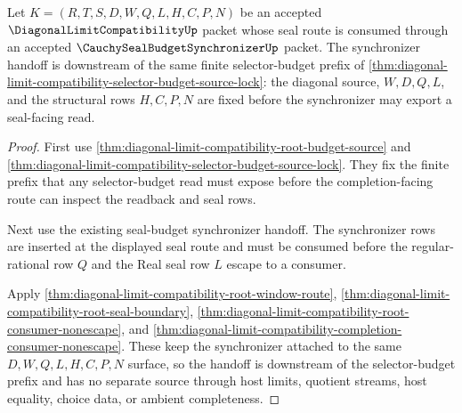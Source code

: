 \begin{theorem}
\label{thm:diagonal-limit-compatibility-seal-synchronizer-budget-handoff}
Let $K=(R,T,S,D,W,Q,L,H,C,P,N)$ be an accepted $\DiagonalLimitCompatibilityUp$ packet whose seal route is consumed through an accepted $\CauchySealBudgetSynchronizerUp$ packet. The synchronizer handoff is downstream of the same finite selector-budget prefix of \autoref{thm:diagonal-limit-compatibility-selector-budget-source-lock}: the diagonal source, $W,D,Q,L$, and the structural rows $H,C,P,N$ are fixed before the synchronizer may export a seal-facing read.
\end{theorem}
\begin{proof}
First use \autoref{thm:diagonal-limit-compatibility-root-budget-source} and \autoref{thm:diagonal-limit-compatibility-selector-budget-source-lock}. They fix the finite prefix that any selector-budget read must expose before the completion-facing route can inspect the readback and seal rows.

Next use the existing seal-budget synchronizer handoff. The synchronizer rows are inserted at the displayed seal route and must be consumed before the regular-rational row $Q$ and the Real seal row $L$ escape to a consumer.

Apply \autoref{thm:diagonal-limit-compatibility-root-window-route}, \autoref{thm:diagonal-limit-compatibility-root-seal-boundary}, \autoref{thm:diagonal-limit-compatibility-root-consumer-nonescape}, and \autoref{thm:diagonal-limit-compatibility-completion-consumer-nonescape}. These keep the synchronizer attached to the same $D,W,Q,L,H,C,P,N$ surface, so the handoff is downstream of the selector-budget prefix and has no separate source through host limits, quotient streams, host equality, choice data, or ambient completeness.
\end{proof}

